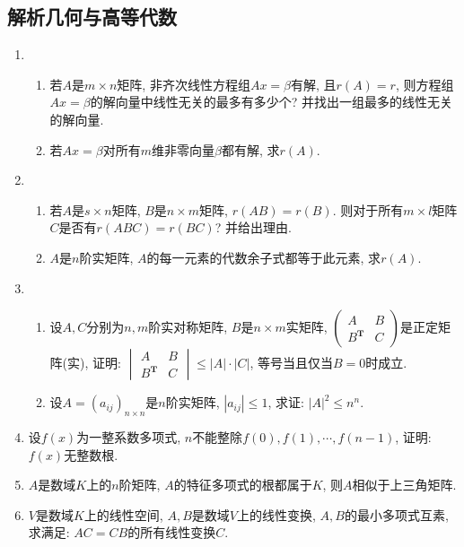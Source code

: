 \documentclass[12pt,a4paper,openany]{book}
\begin{document}
\subsection{解析几何与高等代数}
\begin{enumerate}
\item \begin{enumerate}
\item 若$A$是$m \times n$矩阵, 非齐次线性方程组$Ax = \beta$有解, 且$r(A) = r$, 则方程组$Ax = \beta$的解向量中线性无关的最多有多少个? 并找出一组最多的线性无关的解向量.

\item 若$Ax = \beta$对所有$m$维非零向量$\beta$都有解, 求$r(A)$.
\end{enumerate}

\item \begin{enumerate}
\item 若$A$是$s \times n$矩阵, $B$是$n \times m$矩阵, $r(AB) = r(B)$. 则对于所有$m \times l$矩阵$C$是否有$r(ABC) = r(BC)$? 并给出理由.

\item $A$是$n$阶实矩阵, $A$的每一元素的代数余子式都等于此元素, 求$r(A)$.
\end{enumerate}

\item \begin{enumerate}
\item 设$A,C$分别为$n, m$阶实对称矩阵, $B$是$n \times m$实矩阵, $\begin{pmatrix} A & B \\ B^{\bm{T}} & C \end{pmatrix}$是正定矩阵(实), 证明: $\begin{vmatrix} A & B \\ B^{\bm{T}} & C \end{vmatrix} \le |A| \cdot |C|$, 等号当且仅当$B = 0$时成立.

\item 设$A = (a_{ij})_{n \times n}$是$n$阶实矩阵, $|a_{ij}| \le 1$, 求证: $|A|^2 \le n^n$.
\end{enumerate}

\item 设$f(x)$为一整系数多项式, $n$不能整除$f(0), f(1), \cdots, f(n-1)$, 证明: $f(x)$无整数根.

\item $A$是数域$K$上的$n$阶矩阵, $A$的特征多项式的根都属于$K$, 则$A$相似于上三角矩阵.

\item $V$是数域$K$上的线性空间, $A, B$是数域$V$上的线性变换, $A, B$的最小多项式互素, 求满足: $AC = CB$的所有线性变换$C$.


\end{enumerate}
\end{document}
